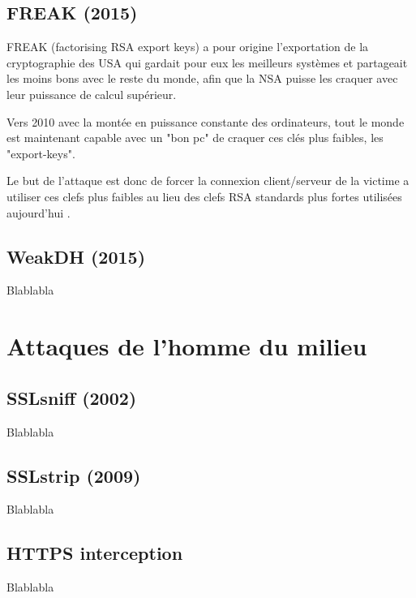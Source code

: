 \subsection{FREAK (2015)}

FREAK (factorising RSA export keys) a pour origine l'exportation de la cryptographie des USA qui gardait pour eux les meilleurs systèmes et partageait les moins bons avec le reste du monde, afin que la NSA puisse les craquer avec leur puissance de calcul supérieur.

Vers 2010 avec la montée en puissance constante des ordinateurs, tout le monde est maintenant capable avec un "bon pc" de craquer ces clés plus faibles, les "export-keys".

Le but de l'attaque est donc de forcer la connexion client/serveur de la victime a utiliser ces clefs plus faibles au lieu des clefs RSA standards plus fortes utilisées aujourd'hui \cite{freak}.

\subsection{WeakDH (2015)}

Blablabla \cite{weakdh}

\section{Attaques de l'homme du milieu}

\subsection{SSLsniff (2002)}

Blablabla \cite{sslsniff-website}

\subsection{SSLstrip (2009)}

Blablabla \cite{sslstrip-website}

\subsection{HTTPS interception}

Blablabla \cite{https-interception}

